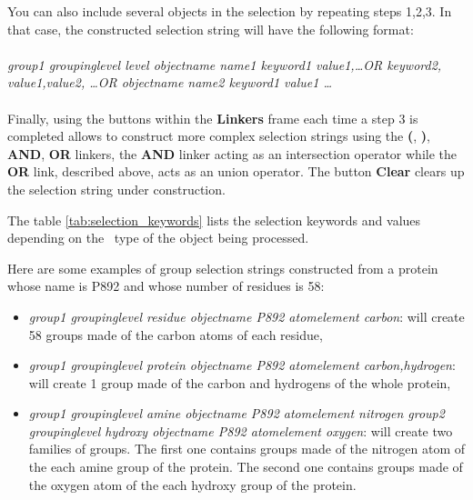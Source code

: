 \documentclass[a4paper,11pt]{report}
\begin{document}
You can also include several objects in the selection by repeating steps 1,2,3. In that case, the constructed selection 
string will have the following format:
\\\\
\textit{group1 groupinglevel level objectname name1 keyword1 value1,\ldots OR keyword2, value1,value2, \ldots OR objectname name2 keyword1 value1 \ldots}
\\\\
Finally, using the buttons within the \textbf{Linkers} frame each time a step 3 is completed allows to construct more complex selection strings using the 
\textbf{(}, \textbf{)}, \textbf{AND}, \textbf{OR} linkers, the \textbf{AND} linker acting as an intersection operator while the 
\textbf{OR} link, described above, acts as an union operator. The button \textbf{Clear} clears up the selection string under construction.

The table \ref{tab:selection_keywords} lists the selection keywords and values depending on the \MMTK\ type of the object being processed.

Here are some examples of group selection strings constructed from a protein whose name is P892 and whose number of residues 
is 58:
\begin{itemize}
\item \textit{group1 groupinglevel residue objectname P892 atomelement carbon}: will create 58 groups made of the carbon atoms of 
each residue,
\item \textit{group1 groupinglevel protein objectname P892 atomelement carbon,hydrogen}: will create 1 group made of the carbon 
and hydrogens of the whole protein,
\item \textit{group1 groupinglevel amine objectname P892 atomelement nitrogen group2 groupinglevel hydroxy objectname P892 atomelement oxygen}: 
will create two families of groups. The first one contains groups made of the nitrogen atom of the each amine group of the protein. 
The second one contains groups made of the oxygen atom of the each hydroxy group of the protein. 
\end{itemize}
\end{document}
